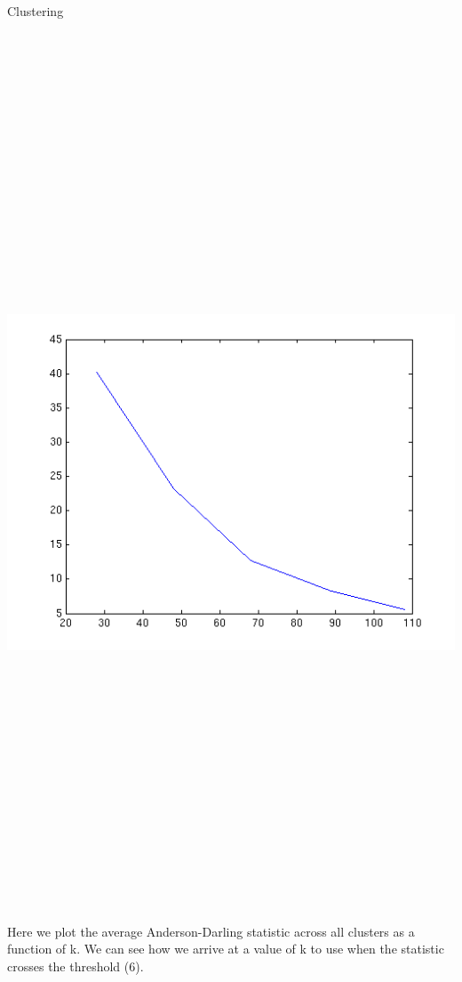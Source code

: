 \documentclass[final,t]{beamer}
\begin{document}
\begin{frame}{}
\begin{columns}[t]
\begin{column}{.3\linewidth}
\begin{block}{Clustering}
       \begin{columns}[c,l]
\includegraphics[width=50cm,height=26cm]{images/gmeans_k_vs_metric.png} 
Here we plot the average Anderson-Darling statistic across all
clusters as a function of k. We can see how we arrive at a value of k
to use when the statistic crosses the threshold (6).
       \end{columns} 


\end{block}
\end{column}
\end{columns}
\end{frame}
\end{document}
